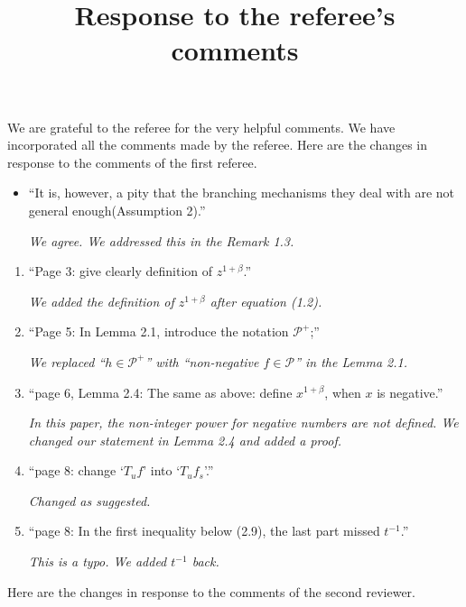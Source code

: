 \documentclass[12pt,a4paper]{amsart}
\title[Response]{\large Response to the referee's comments}
\begin{document}
	\maketitle	
	We are grateful to the referee for the very helpful comments.
	We have incorporated all the comments made by the referee.
	Here are the changes in response to the comments of the first referee.
	
	\begin{itemize}
		\item ``It is, however, a pity that the branching mechanisms they deal with are not general enough(Assumption 2).''
		
		\emph{We agree. We addressed this in the Remark 1.3.}
		
	\end{itemize}
\begin{enumerate}
	\item ``Page 3: give clearly definition of $z^{1+\beta}$.''
	
	\emph{We added the definition of $z^{1+\beta}$ after equation (1.2).}
	
	\item ``Page 5: In Lemma 2.1, introduce the notation $\mathcal P^+$;''
	
	\emph{We replaced ``$h\in \mathcal P^+$'' with ``non-negative $f\in \mathcal P$'' in the Lemma 2.1.}
	
	\item ``page 6, Lemma 2.4: The same as above: define $x^{1+\beta}$, when $x$ is negative.''
	
	\emph{In this paper, the non-integer power for negative numbers are not defined. We changed our statement in Lemma 2.4 and added a proof.}
	
	\item ``page 8: change `$T_uf$' into `$T_uf_s$'.''
	
	\emph{Changed as suggested.}
	
	\item ``page 8: In the first inequality below (2.9), the last part missed $t^{-1}$.''
	
	\emph{This is a typo. We added $t^{-1}$ back.}
	
\end{enumerate}
	Here are the changes in response to the comments of the second reviewer.
\end{document}

